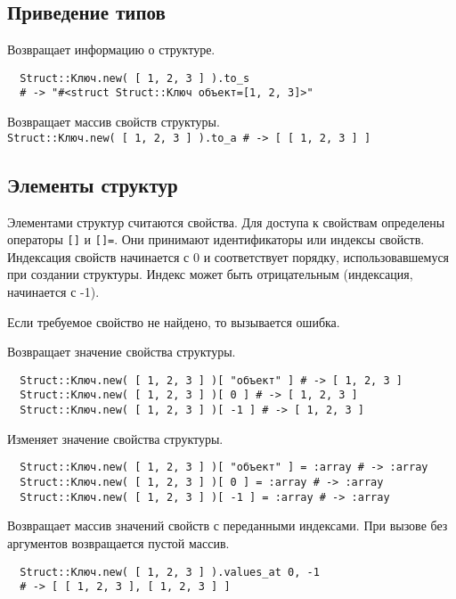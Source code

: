 \subsection*{Приведение типов} 

\begin{methodlist}
  Возвращает информацию о структуре.
  \begin{verbatim}
  Struct::Kлюч.new( [ 1, 2, 3 ] ).to_s 
  # -> "#<struct Struct::Kлюч объект=[1, 2, 3]>"
  \end{verbatim} 

  Возвращает массив свойств структуры. 
  \\\verb!Struct::Kлюч.new( [ 1, 2, 3 ] ).to_a # -> [ [ 1, 2, 3 ] ]!
\end{methodlist}

\subsection*{Элементы структур}

Элементами структур считаются свойства. Для доступа к свойствам определены операторы \verb![]! и \verb![]=!. Они принимают идентификаторы или индексы свойств. Индексация свойств начинается с 0 и соответствует порядку, использовавшемуся при создании структуры. Индекс может быть отрицательным (индексация, начинается с -1).

Если требуемое свойство не найдено, то вызывается ошибка. 

\begin{methodlist}
  Возвращает значение свойства структуры.
  \begin{verbatim}
  Struct::Kлюч.new( [ 1, 2, 3 ] )[ "объект" ] # -> [ 1, 2, 3 ]
  Struct::Kлюч.new( [ 1, 2, 3 ] )[ 0 ] # -> [ 1, 2, 3 ] 
  Struct::Kлюч.new( [ 1, 2, 3 ] )[ -1 ] # -> [ 1, 2, 3 ]
  \end{verbatim}

  Изменяет значение свойства структуры.
  \begin{verbatim}
  Struct::Kлюч.new( [ 1, 2, 3 ] )[ "объект" ] = :array # -> :array
  Struct::Kлюч.new( [ 1, 2, 3 ] )[ 0 ] = :array # -> :array 
  Struct::Kлюч.new( [ 1, 2, 3 ] )[ -1 ] = :array # -> :array
  \end{verbatim} 
 
  Возвращает массив значений свойств с переданными индексами. При вызове без аргументов возвращается пустой массив.
  \begin{verbatim}
  Struct::Kлюч.new( [ 1, 2, 3 ] ).values_at 0, -1 
  # -> [ [ 1, 2, 3 ], [ 1, 2, 3 ] ]
  \end{verbatim} 
\end{methodlist}

